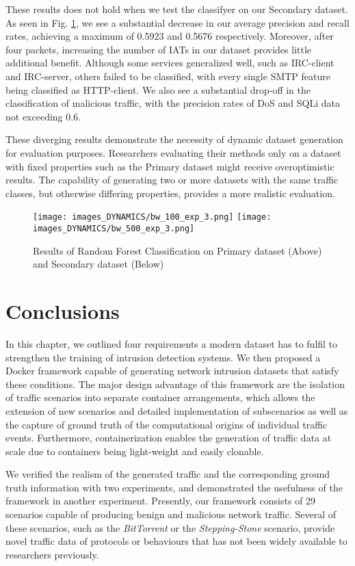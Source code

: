 These results does not hold when we test the classifyer on our Secondary dataset. As seen in Fig. \ref{Fig:Primary}, we see a substantial decrease in our average precision and recall rates, achieving a maximum of 0.5923 and 0.5676 respectively. Moreover, after four packets, increasing the number of IATs in our dataset provides little additional benefit. Although some services generalized well, such as IRC-client and IRC-server, others failed to be classified, with every single SMTP feature being classified as HTTP-client. We also see a substantial drop-off in the classification of malicious traffic, with the precision rates of DoS and SQLi data not exceeding 0.6.

These diverging results demonstrate the necessity of dynamic dataset generation for evaluation purposes. Researchers evaluating their methods only on a dataset with fixed properties such as the Primary dataset might receive overoptimistic results. The capability of generating two or more datasets with the same traffic classes, but otherwise differing properties, provides a more realistic evaluation.


\begin{figure}[ht!]
\centering
 \texttt{[image: images\_DYNAMICS/bw\_100\_exp\_3.png]}
 \texttt{[image: images\_DYNAMICS/bw\_500\_exp\_3.png]}
\caption{Results of Random Forest Classification on Primary dataset (Above) and Secondary dataset (Below)}
\label{Fig:Primary}
\end{figure}


\section{Conclusions}\label{Sec:Conclusion}

In this chapter, we outlined four requirements a modern dataset has to fulfil to strengthen the training of intrusion detection systems. We then proposed a Docker framework capable of generating network intrusion datasets that satisfy these conditions. The major design advantage of this framework are the isolation of traffic scenarios into separate container arrangements, which allows the extension of new scenarios and detailed implementation of subscenarios as well as the capture of ground truth of the computational origins of individual traffic events. Furthermore, containerization enables the generation of traffic data at scale due to containers being light-weight and easily clonable.

We verified the realism of the generated traffic and the corresponding ground truth information with two experiments, and demonstrated the usefulness of the framework in another experiment.
Presently, our framework consists of 29 scenarios capable of producing benign and malicious network traffic. Several of these scenarios, such as the \emph{BitTorrent} or the \emph{Stepping-Stone} scenario, provide novel traffic data of protocols or behaviours that has not been widely available to researchers previously.


